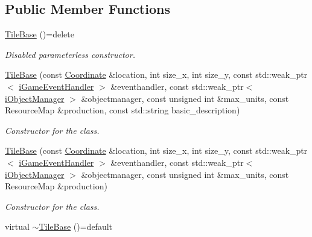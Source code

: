 \subsection*{Public Member Functions}
\begin{DoxyCompactItemize}
\item 
\hypertarget{class_course_1_1_tile_base_a6386bf6bc05528b4337dee65f6286e06}{\hyperlink{class_course_1_1_tile_base_a6386bf6bc05528b4337dee65f6286e06}{Tile\-Base} ()=delete}\label{class_course_1_1_tile_base_a6386bf6bc05528b4337dee65f6286e06}

\begin{DoxyCompactList}\small\item\em Disabled parameterless constructor. \end{DoxyCompactList}\item 
\hyperlink{class_course_1_1_tile_base_ac75e01d24e5649900430bf31d5a6dbd0}{Tile\-Base} (const \hyperlink{class_course_1_1_coordinate}{Coordinate} \&location, int size\-\_\-x, int size\-\_\-y, const std\-::weak\-\_\-ptr$<$ \hyperlink{class_course_1_1i_game_event_handler}{i\-Game\-Event\-Handler} $>$ \&eventhandler, const std\-::weak\-\_\-ptr$<$ \hyperlink{class_course_1_1i_object_manager}{i\-Object\-Manager} $>$ \&objectmanager, const unsigned int \&max\-\_\-units, const Resource\-Map \&production, const std\-::string basic\-\_\-description)
\begin{DoxyCompactList}\small\item\em Constructor for the class. \end{DoxyCompactList}\item 
\hyperlink{class_course_1_1_tile_base_af9440c382cd3685bfea4a11898bc55f3}{Tile\-Base} (const \hyperlink{class_course_1_1_coordinate}{Coordinate} \&location, int size\-\_\-x, int size\-\_\-y, const std\-::weak\-\_\-ptr$<$ \hyperlink{class_course_1_1i_game_event_handler}{i\-Game\-Event\-Handler} $>$ \&eventhandler, const std\-::weak\-\_\-ptr$<$ \hyperlink{class_course_1_1i_object_manager}{i\-Object\-Manager} $>$ \&objectmanager, const unsigned int \&max\-\_\-units, const Resource\-Map \&production)
\begin{DoxyCompactList}\small\item\em Constructor for the class. \end{DoxyCompactList}\item 
\hypertarget{class_course_1_1_tile_base_a821db6b529d987eac53a958084fe2d5c}{virtual \hyperlink{class_course_1_1_tile_base_a821db6b529d987eac53a958084fe2d5c}{$\sim$\-Tile\-Base} ()=default}\label{class_course_1_1_tile_base_a821db6b529d987eac53a958084fe2d5c}


\end{DoxyCompactItemize}
